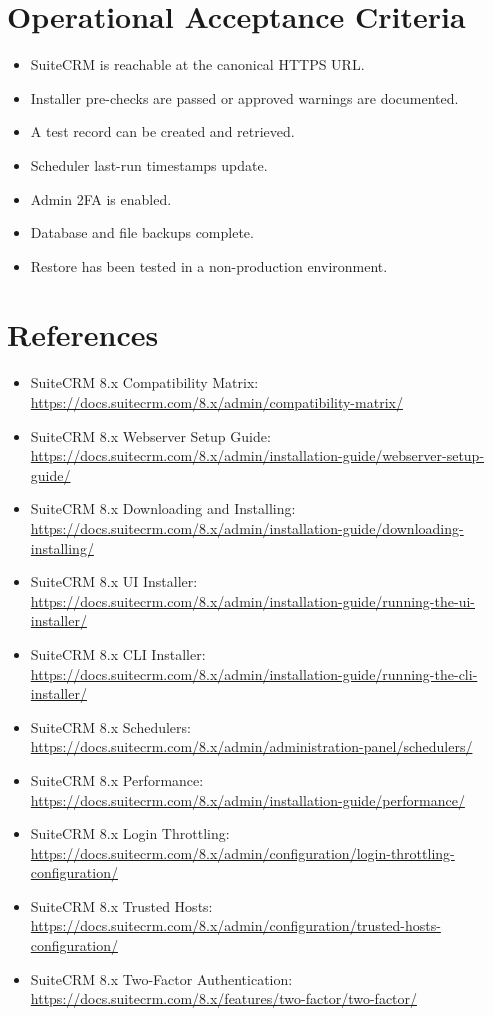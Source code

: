 \documentclass[11pt]{article}
\begin{document}
\section{Operational Acceptance Criteria}
\begin{itemize}
  \item SuiteCRM is reachable at the canonical HTTPS URL.
  \item Installer pre-checks are passed or approved warnings are documented.
  \item A test record can be created and retrieved.
  \item Scheduler last-run timestamps update.
  \item Admin 2FA is enabled.
  \item Database and file backups complete.
  \item Restore has been tested in a non-production environment.
\end{itemize}

\section{References}
\begin{itemize}
  \item SuiteCRM 8.x Compatibility Matrix: \url{https://docs.suitecrm.com/8.x/admin/compatibility-matrix/}
  \item SuiteCRM 8.x Webserver Setup Guide: \url{https://docs.suitecrm.com/8.x/admin/installation-guide/webserver-setup-guide/}
  \item SuiteCRM 8.x Downloading and Installing: \url{https://docs.suitecrm.com/8.x/admin/installation-guide/downloading-installing/}
  \item SuiteCRM 8.x UI Installer: \url{https://docs.suitecrm.com/8.x/admin/installation-guide/running-the-ui-installer/}
  \item SuiteCRM 8.x CLI Installer: \url{https://docs.suitecrm.com/8.x/admin/installation-guide/running-the-cli-installer/}
  \item SuiteCRM 8.x Schedulers: \url{https://docs.suitecrm.com/8.x/admin/administration-panel/schedulers/}
  \item SuiteCRM 8.x Performance: \url{https://docs.suitecrm.com/8.x/admin/installation-guide/performance/}
  \item SuiteCRM 8.x Login Throttling: \url{https://docs.suitecrm.com/8.x/admin/configuration/login-throttling-configuration/}
  \item SuiteCRM 8.x Trusted Hosts: \url{https://docs.suitecrm.com/8.x/admin/configuration/trusted-hosts-configuration/}
  \item SuiteCRM 8.x Two-Factor Authentication: \url{https://docs.suitecrm.com/8.x/features/two-factor/two-factor/}
\end{itemize}
\end{document}
